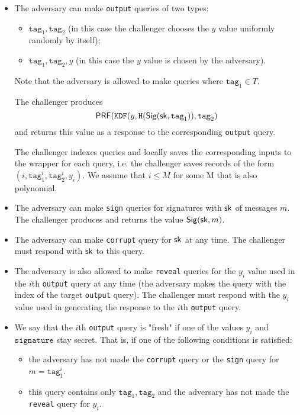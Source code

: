 \documentclass{article}
\begin{document}
\begin{itemize}
	
	\item The adversary can make \texttt{output} queries of two types:
	\begin{itemize}
		\item $\texttt{tag}_1, \texttt{tag}_2$ (in this case the challenger chooses the $y$ value uniformly randomly by itself);
		\item $\texttt{tag}_1, \texttt{tag}_2,y$ (in this case the $y$ value is chosen by the adversary).
	\end{itemize}
	
	Note that the adversary is allowed to make queries where $\texttt{tag}_1 \in T$. 
	
	The challenger produces $$
	\mathsf{PRF}(\texttt{KDF}(y, \texttt{H}(\mathsf{Sig} (\mathsf{sk},\texttt{tag}_1)), \texttt{tag}_2 )
	$$
	and returns this value as a response to the corresponding \texttt{output} query.
	
	The challenger indexes queries and locally saves the corresponding inputs to the wrapper for each query, i.e. the challenger saves records of the form $(i,\texttt{tag}_1^i,\texttt{tag}_2^i,y_i)$.  We assume that $i \le M$ for some M that is also polynomial.
	
	\item The adversary can make \texttt{sign} queries for signatures with $\mathsf{sk}$ of messages $m$. The challenger produces and returns the value $\mathsf{Sig} (\mathsf{sk}, m)$.
	
	\item The adversary can make \texttt{corrupt} query for $\mathsf{sk}$ at any time. The challenger must respond with $\mathsf{sk}$ to this query.
	
	\item The adversary is also allowed to make \texttt{reveal} queries for the $y_i$ value used in the $i$th \texttt{output} query at any time (the adversary makes the query with the index of the target \texttt{output} query). The challenger must respond with the $y_i$ value used in generating the response to the $i$th \texttt{output} query.
	
	\item We say that the $i$th \texttt{output} query is "fresh" if one of the values $y_i$ and $\mathrm{\texttt{signature}}$ stay secret. That is, if one of the following conditions is satisfied:
	\begin{itemize}
		\item the adversary has not made the \texttt{corrupt} query or the \texttt{sign} query for $m = \texttt{tag}_1^i$. 
		\item this query contains only $\texttt{tag}_1, \texttt{tag}_2$ and the adversary has not made the \texttt{reveal} query for  $y_i$.
	\end{itemize}
	

\end{itemize}
\end{document}
